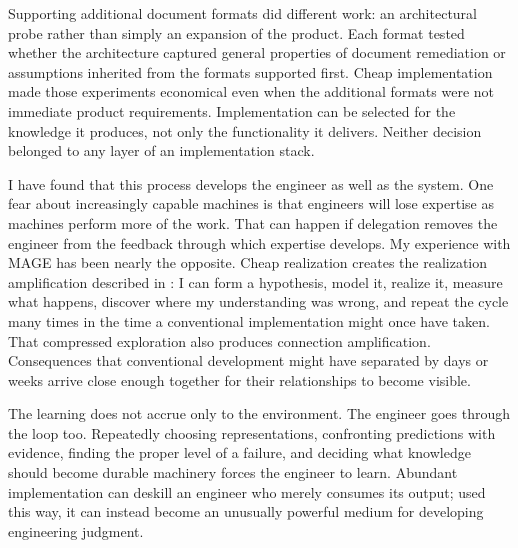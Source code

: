 
Supporting additional document formats did different work: an architectural probe rather than simply an expansion of the product. Each format tested whether the architecture captured general properties of document remediation or assumptions inherited from the formats supported first. Cheap implementation made those experiments economical even when the additional formats were not immediate product requirements. Implementation can be selected for the knowledge it produces, not only the functionality it delivers. Neither decision belonged to any layer of an implementation stack.


I have found that this process develops the engineer as well as the system. One fear about increasingly capable machines is that engineers will lose expertise as machines perform more of the work. That can happen if delegation removes the engineer from the feedback through which expertise develops. My experience with MAGE has been nearly the opposite. Cheap realization creates the realization amplification described in : I can form a hypothesis, model it, realize it, measure what happens, discover where my understanding was wrong, and repeat the cycle many times in the time a conventional implementation might once have taken. That compressed exploration also produces connection amplification. Consequences that conventional development might have separated by days or weeks arrive close enough together for their relationships to become visible.

The learning does not accrue only to the environment. The engineer goes through the loop too. Repeatedly choosing representations, confronting predictions with evidence, finding the proper level of a failure, and deciding what knowledge should become durable machinery forces the engineer to learn. Abundant implementation can deskill an engineer who merely consumes its output; used this way, it can instead become an unusually powerful medium for developing engineering judgment.

